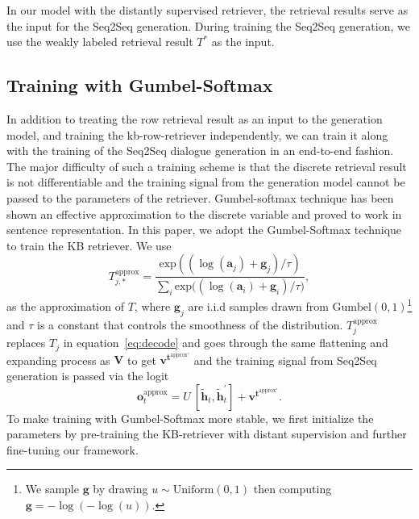 \documentclass[11pt,a4paper]{article}
\begin{document}
 In our model with the distantly supervised retriever,
 the retrieval results serve as the input
 for the Seq2Seq generation.
 During training the Seq2Seq generation,
 we use the weakly labeled retrieval result $T^{*}$
 as the input.

 
 \subsection{Training  with Gumbel-Softmax}
 In addition to treating the row retrieval result as an input to the generation model,
 and training the kb-row-retriever independently,
 we can train it along with the
 training of the Seq2Seq dialogue generation in an end-to-end fashion.
 The major difficulty of such a training scheme
 is that the discrete retrieval result is not differentiable
 and the training signal from the generation model cannot be passed
 to the parameters of the retriever.
 Gumbel-softmax technique \cite{45822} has been shown an
 effective approximation to the discrete variable
 and proved to work in sentence representation.
 In this paper, we adopt the Gumbel-Softmax technique to train the KB retriever.
 We use \[
 T^{\text{approx}}_{j,*} = \frac{\text{exp}{ ((\log(\mathbf{a}_j) + \mathbf{g}_{j})/\tau) } }{\sum_i{\text{exp} {((\log(\mathbf{a}_i) + \mathbf{g}_{i})/\tau})}},
 \]
 as the approximation of $T$,
 where
 $\mathbf{g}_{j}$ are i.i.d samples drawn from $\text{Gumbel}(0,1)$\footnote{
 	We sample $\mathbf{g}$ by drawing $u \sim \text{Uniform}(0, 1)$ then computing $\mathbf{g} = -\log(-\log(u))$.
 }
 and $\tau$ is a constant that controls the smoothness of the distribution.
 $T^{\text{approx}}_{j}$ replaces $T^{\text{}}_{j}$ in equation~\ref{eq:decode} and goes through the same
 flattening and expanding process as $\mathbf{V}$
 to get $\mathbf{v}^{\mathbf{t}^{\text{approx}'}}$ and
 the training signal from Seq2Seq generation
 is passed via the logit
 \[
 \mathbf{o}^{\text{approx}}_t = U\ [\tilde{\mathbf{h}}_t, \tilde{\mathbf{h}}^{'}_t] +\mathbf{v}^{\mathbf{t}^{\text{approx}'}}.
 \]	
 To make training with Gumbel-Softmax more stable,
 we first initialize the parameters by pre-training the KB-retriever with distant supervision and further fine-tuning our framework.
 
\end{document}
